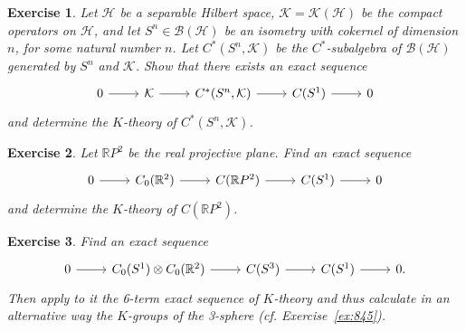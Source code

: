 \documentclass{book}
\newtheorem{exercise}{Exercise}[section]
\begin{document}
\begin{exercise}\label{ex:849}
  Let \(\mathcal{H}\) be a separable Hilbert space, \(\mathcal{K}=\mathcal{K}(\mathcal{H})\) be the compact operators on \(\mathcal{H}\),
  and let \(S^n\in\mathcal{B}(\mathcal{H})\) be an isometry with cokernel of dimension \(n\), for some natural number \(n\). Let \(C^*(S^n,\mathcal{K})\) be the 
  \(C^*\)-subalgebra of \(\mathcal{B}(\mathcal{H})\) generated by \(S^n\) and \(\mathcal{K}\).
  Show that there exists an exact sequence
  \[
    \begin{tikzcd}
      0\arrow[r]&\mathcal{K}\arrow[r]&C^*(S^n,\mathcal{K})\arrow[r]&C(S^1)\arrow[r]&0
    \end{tikzcd}
  \]
  and determine the \(K\)-theory of \(C^*(S^n,\mathcal{K})\).
\end{exercise}
\begin{exercise}\label{ex:8410}
  Let \(\mathbb{R}P^2\) be the real projective plane. Find an exact sequence
  \[
    \begin{tikzcd}
      0\arrow[r]&C_0(\mathbb{R}^2)\arrow[r]&C(\mathbb{R}P^2)\arrow[r]&C(S^1)\arrow[r]&0
    \end{tikzcd}
  \]
  and determine the \(K\)-theory of \(C(\mathbb{R}P^2)\).
\end{exercise}
\begin{exercise}\label{ex:8411}
  Find an exact sequence
  \[
    \begin{tikzcd}
      0\arrow[r]&C_0(S^1)\otimes C_0(\mathbb{R}^2)\arrow[r]&C(S^3)\arrow[r]&C(S^1)\arrow[r]&0.
    \end{tikzcd}
  \]
  Then apply to it the 6-term exact sequence of \(K\)-theory and thus calculate in an alternative way the \(K\)-groups of the 3-sphere (cf. Exercise~\ref{ex:845}).
\end{exercise}
\end{document}
